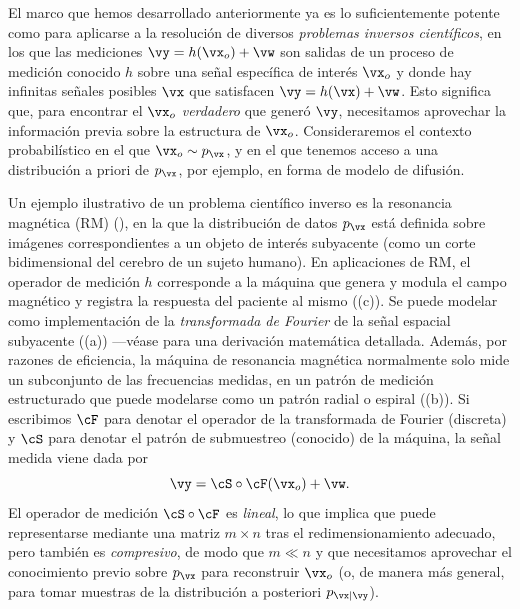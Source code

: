 \documentclass[../../book-main_es.tex]{subfiles}
\begin{document}
El marco que hemos desarrollado anteriormente ya es lo suficientemente potente como para
aplicarse a la resolución de diversos \textit{problemas inversos científicos}, en los que
las mediciones
$\vy = h(\vx_o) + \vw$ son salidas de un proceso de medición conocido $h$ sobre
una señal específica de interés $\vx_o$ y donde hay infinitas
señales posibles $\vx$ que satisfacen $\vy = h(\vx) + \vw$. Esto significa que, para
encontrar el $\vx_o$ \textit{verdadero} que generó $\vy$, necesitamos aprovechar la información previa
sobre la estructura de $\vx_o$.
Consideraremos el contexto probabilístico en el que $\vx_o \sim p_{\vx}$, y en el que
tenemos acceso a una distribución a priori de $p_{\vx}$, por ejemplo, en forma de modelo de difusión.

Un ejemplo ilustrativo de un problema científico inverso es la resonancia magnética
(RM) (), en la que la distribución de datos
$p_{\vx}$ está definida sobre imágenes correspondientes a un objeto de interés subyacente (como
un corte bidimensional del cerebro de un sujeto humano). En aplicaciones de RM, el operador de medición
$h$ corresponde a la máquina que genera y modula el campo magnético
y registra la respuesta del paciente al mismo
((c)). Se puede modelar como implementación de la
\textit{transformada de Fourier} de la señal espacial subyacente
((a)) ---véase \cite[Capítulo 10]{Wright-Ma-2022} para
una derivación matemática detallada.
Además, por razones de eficiencia, la máquina de resonancia magnética normalmente solo mide
un subconjunto de las frecuencias medidas, en un patrón de medición estructurado que
puede modelarse como un patrón radial o espiral
((b)). Si escribimos $\cF$ para denotar el
operador de la transformada de Fourier
(discreta) y $\cS$ para denotar el patrón de submuestreo (conocido)
de la máquina, la señal medida viene dada por
\begin{equation}\label{eq:mri-measurement}
    \vy = \cS \circ \cF(\vx_o) + \vw.
\end{equation}
El operador de medición $\cS \circ \cF$ es \textit{lineal}, lo que implica que
puede representarse mediante una matriz $m \times n$ tras el redimensionamiento adecuado, pero
también es \textit{compresivo}, de modo que $m \ll n$ y que necesitamos
aprovechar el conocimiento previo sobre $p_{\vx}$ para reconstruir $\vx_o$ (o, de manera más
general, para tomar muestras de la distribución a posteriori $p_{\vx \mid \vy}$).
\end{document}
